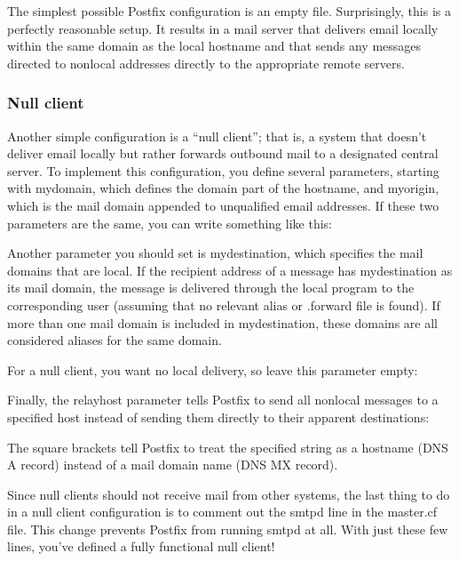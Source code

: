 The simplest possible Postfix configuration is an empty file.
Surprisingly, this is a perfectly reasonable setup. It results in a mail
server that delivers email locally within the same domain as the local
hostname and that sends any messages directed to nonlocal addresses
directly to the appropriate remote servers.

\subsubsection[Null
client]{\texorpdfstring{\protect\hypertarget{part0026_split_061.htmlux5cux23_idTextAnchor1175}{}{}Null
client}{Null client}}

\protect\hypertarget{part0026_split_061.htmlux5cux23_idIndexMarker2710}{}{}Another
simple configuration is a ``null client''; that is, a system that
doesn't deliver email locally but rather forwards outbound mail to a
designated central server. To implement this configuration, you define
several parameters, starting with {mydomain}, which defines the domain
part of the hostname, and {myorigin}, which is the mail domain appended
to unqualified email addresses. If these two parameters are the same,
you can write something like this:


Another parameter you should set is {mydestination}, which specifies the
mail domains that are local. If the recipient address of a message has
{mydestination} as its mail domain, the message is delivered through the
{local} program to the corresponding user (assuming that no relevant
alias or {.forward} file is found). If more than one mail domain is
included in{ mydestination}, these domains are all considered aliases
for the same domain.

For a null client, you want no local delivery, so leave this parameter
empty:


Finally, the {relayhost} parameter tells Postfix to send all nonlocal
messages to a specified host instead of sending them directly to their
apparent destinations:


The square brackets tell Postfix to treat the specified string as a
hostname (DNS A record) instead of a mail domain name (DNS MX record).

Since null clients should not receive mail from other systems, the last
thing to do in a null client configuration is to comment out the {smtpd}
line in the {master.cf} file. This change prevents Postfix from running
{smtpd} at all. With just these few lines, you've defined a fully
functional null client!

